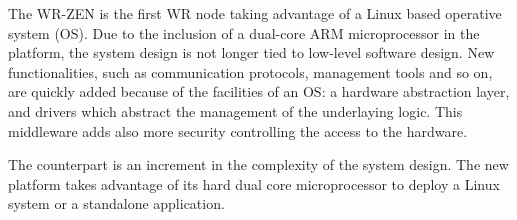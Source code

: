 %

The WR-ZEN is the first WR node taking advantage of a Linux 
based operative system (OS). Due to the inclusion of a dual-core ARM 
microprocessor in the platform, the system design is not longer tied to 
low-level software design. New functionalities, such as communication 
protocols, management tools and so on, are quickly added because of the 
facilities of an OS: a hardware abstraction layer, and drivers which abstract 
the management of the underlaying logic. This middleware adds also more 
security controlling the access to the hardware.

The counterpart is an increment in the complexity of the system design. The new platform takes advantage of its hard dual core microprocessor to deploy a Linux system or a standalone application.

